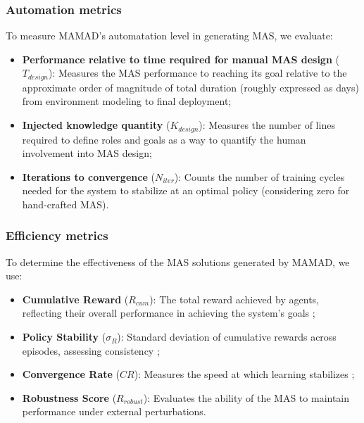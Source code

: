 \documentclass[pdflatex,sn-mathphys-num]{sn-jnl}%
\theoremstyle{thmstyleone}%
\theoremstyle{thmstyletwo}%
\theoremstyle{thmstylethree}%
\begin{document}
\subsubsection{Automation metrics}
To measure MAMAD's automatation level in generating MAS, we evaluate:
\begin{itemize}
    \item \textbf{Performance relative to time required for manual MAS design} ($T_{design}$): Measures the MAS performance to reaching its goal relative to the approximate order of magnitude of total duration (roughly expressed as days) from environment modeling to final deployment;
    \item \textbf{Injected knowledge quantity} ($K_{design}$): Measures the number of lines required to define roles and goals as a way to quantify the human involvement into MAS design;
    \item \textbf{Iterations to convergence} ($N_{iter}$): Counts the number of training cycles needed for the system to stabilize at an optimal policy (considering zero for hand-crafted MAS).
\end{itemize}

\subsubsection{Efficiency metrics}
To determine the effectiveness of the MAS solutions generated by MAMAD, we use:
\begin{itemize}
    \item \textbf{Cumulative Reward} ($R_{cum}$): The total reward achieved by agents, reflecting their overall performance in achieving the system's goals ;
    \item \textbf{Policy Stability} ($\sigma_R$): Standard deviation of cumulative rewards across episodes, assessing consistency ;
    \item \textbf{Convergence Rate} ($CR$): Measures the speed at which learning stabilizes ;
    \item \textbf{Robustness Score} ($R_{robust}$): Evaluates the ability of the MAS to maintain performance under external perturbations.
\end{itemize}
\end{document}
